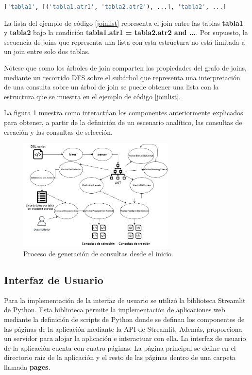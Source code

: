 \begin{lstlisting}[label={joinlist}, caption={Estructura de una lista que representa una secuencia de joins}, language=python]
    ['tabla1', [('tabla1.atr1', 'tabla2.atr2'), ...], 'tabla2', ...]
\end{lstlisting}

La lista del ejemplo de c\'odigo \ref{joinlist} representa el join entre las tablas \textbf{tabla1} y \textbf{tabla2} 
bajo la condición \textbf{tabla1.atr1 = tabla2.atr2 and ...}. Por supuesto, la secuencia de joins 
que representa una lista con esta estructura no est\'a limitada a un join entre solo dos tablas.

N\'otese que como los \'arboles de join comparten las propiedades del grafo de joins, mediante un recorrido 
DFS sobre el subárbol que representa una interpretaci\'on de una consulta sobre un \'arbol de join se puede 
obtener una lista con la estructura que se muestra en el ejemplo de c\'odigo \ref{joinlist}. 

La figura \ref{fig:allpro} muestra como interactúan los componentes anteriormente explicados 
para obtener, a partir de la definición de un escenario anal\'itico, las consultas de creación y las consultas de  
selección.

\begin{figure}[H]
    \centering
    \includegraphics[width=0.7\textwidth]{Graphics/all_procces.drawio.png}
    \caption{Proceso de generación de consultas desde el inicio.}
    \label{fig:allpro}
\end{figure}

\subsection{Interfaz de Usuario}

Para la implementación de la interfaz de usuario se utilizó la biblioteca Streamlit de Python. Esta biblioteca 
permite la implementación de aplicaciones web mediante la definición de scripts de Python donde se 
definan los componentes de las páginas de la aplicación mediante la API de Streamlit. Además, proporciona un 
servidor para alojar la aplicación e interactuar con ella. La interfaz de usuario de la aplicación cuenta 
con cuatro páginas. La página principal se define en el directorio raíz de la aplicación y el resto de las 
páginas dentro de una carpeta llamada \textbf{pages}. 

